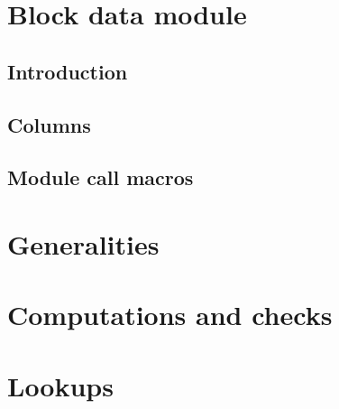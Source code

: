 

\section{Block data module}
\subsection{Introduction}                \label{block data: intro}                     
\subsection{Columns}                     \label{block data: columns}                   
\subsection{Module call macros}          \label{block data: module calls}              
\section{Generalities}                   \label{block data: generalities}              
\section{Computations and checks}        \label{block data: computations and checks}   
\section{Lookups}                        \label{block data: lookups}                   
